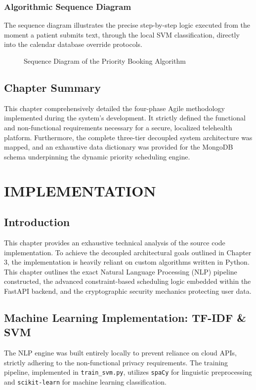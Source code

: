 \documentclass[12pt,a4paper]{report}
\begin{document}
\subsection{Algorithmic Sequence Diagram}
The sequence diagram illustrates the precise step-by-step logic executed from the moment a patient submits text, through the local SVM classification, directly into the calendar database override protocols.
\begin{figure}[H]
    \centering
    \vspace{8cm}
    \caption{Sequence Diagram of the Priority Booking Algorithm}
\end{figure}

\section{Chapter Summary}
This chapter comprehensively detailed the four-phase Agile methodology implemented during the system's development. It strictly defined the functional and non-functional requirements necessary for a secure, localized telehealth platform. Furthermore, the complete three-tier decoupled system architecture was mapped, and an exhaustive data dictionary was provided for the MongoDB schema underpinning the dynamic priority scheduling engine.

\chapter{IMPLEMENTATION}

\section{Introduction}
This chapter provides an exhaustive technical analysis of the source code implementation. To achieve the decoupled architectural goals outlined in Chapter 3, the implementation is heavily reliant on custom algorithms written in Python. This chapter outlines the exact Natural Language Processing (NLP) pipeline constructed, the advanced constraint-based scheduling logic embedded within the FastAPI backend, and the cryptographic security mechanics protecting user data.

\section{Machine Learning Implementation: TF-IDF \& SVM}
The NLP engine was built entirely locally to prevent reliance on cloud APIs, strictly adhering to the non-functional privacy requirements. The training pipeline, implemented in \texttt{train\_svm.py}, utilizes \texttt{spaCy} for linguistic preprocessing and \texttt{scikit-learn} for machine learning classification.
\end{document}
